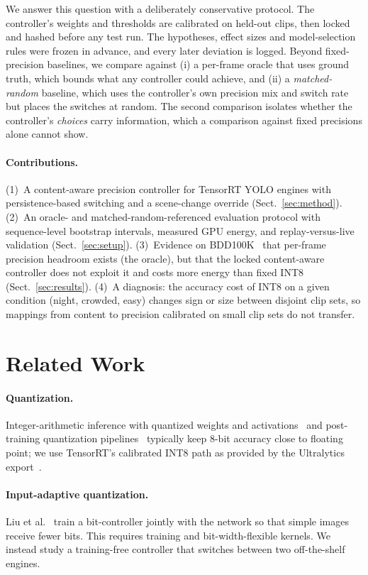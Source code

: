 \documentclass{svproc}
\begin{document}
We answer this question with a deliberately conservative protocol. The controller's weights and thresholds are calibrated on held-out clips,
then locked and hashed before any test run. The hypotheses, effect sizes and model-selection rules were frozen
in advance, and every later deviation is logged. Beyond fixed-precision baselines, we compare against (i) a per-frame
oracle that uses ground truth, which bounds what any controller could achieve, and (ii) a \emph{matched-random}
baseline, which uses the controller's own precision mix and switch rate but places the switches at random. The second
comparison isolates whether the controller's \emph{choices} carry information, which a comparison against fixed
precisions alone cannot show.

\paragraph{Contributions.}
(1)~A content-aware precision controller for TensorRT YOLO engines with persistence-based switching and a
scene-change override (Sect.~\ref{sec:method}).
(2)~An oracle- and matched-random-referenced evaluation protocol with sequence-level bootstrap intervals, measured
GPU energy, and replay-versus-live validation (Sect.~\ref{sec:setup}).
(3)~Evidence on BDD100K~\cite{bdd100k} that per-frame precision headroom exists (the oracle), but that the locked
content-aware controller does not exploit it and costs more energy than fixed INT8 (Sect.~\ref{sec:results}).
(4)~A diagnosis: the accuracy cost of INT8 on a given condition (night, crowded, easy) changes sign or size
between disjoint clip sets, so mappings from content to precision calibrated on small clip sets do not transfer.

\section{Related Work}
\paragraph{Quantization.} Integer-arithmetic inference with quantized weights and activations~\cite{jacob2018} and
post-training quantization pipelines~\cite{nagel2021} typically keep 8-bit accuracy close to floating point; we use
TensorRT's calibrated INT8 path as provided by the Ultralytics export~\cite{ultralytics}.
\paragraph{Input-adaptive quantization.} Liu et al.~\cite{liu2022} train a bit-controller jointly with the network so
that simple images receive fewer bits. This requires training and bit-width-flexible kernels. We instead study a
training-free controller that switches between two off-the-shelf engines.
\end{document}
